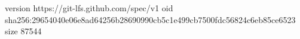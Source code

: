 version https://git-lfs.github.com/spec/v1
oid sha256:29654040e06e8ad64256b28690990cb5c1e499cb7500fdc56824c6eb85ce6523
size 87544
